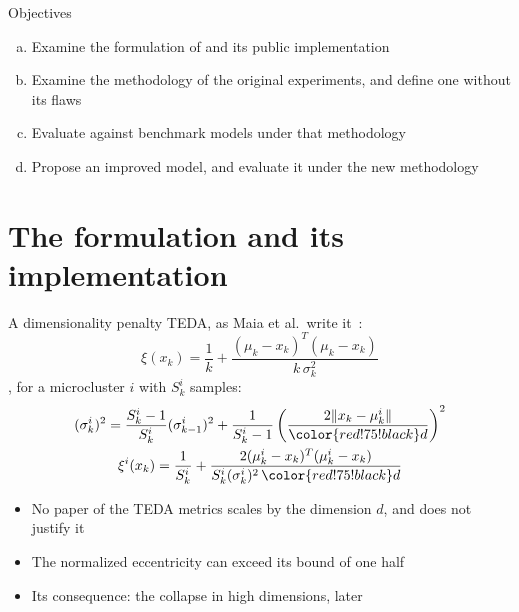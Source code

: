 \documentclass[aspectratio=169]{beamer}
\newcommand{\hl}[1]{{\color{red!75!black}#1}}
\begin{document}
\begin{frame}{Objectives}
  \begin{enumerate}[a)]
    \item Examine the formulation of \MicroTEDAClus and its public implementation
    \item Examine the methodology of the original experiments, and define one without its flaws
    \item Evaluate \MicroTEDAClus against benchmark models under that methodology
    \item Propose an improved model, and evaluate it under the new methodology
  \end{enumerate}
\end{frame}

\section{The formulation and its implementation}

\begin{frame}{A dimensionality penalty}
  TEDA, as Maia et al.\ write it~\cite{angelov2014outside,maia2020evolvclus}:
  \[
    \xi(x_k) = \frac{1}{k} + \frac{(\mu_k - x_k)^T(\mu_k - x_k)}{k\,\sigma^2_k}
  \]
  \MicroTEDAClus, for a microcluster $i$ with $S^i_k$ samples:
  \begin{gather*}
    (\sigma^i_k)^2 = \frac{S^i_k - 1}{S^i_k}(\sigma^i_{k-1})^2 + \frac{1}{S^i_k - 1}\left(\frac{2\lVert x_k - \mu^i_k\rVert}{\hl{d}}\right)^2\\
    \xi^i(x_k) = \frac{1}{S^i_k} + \frac{2(\mu^i_k - x_k)^T(\mu^i_k - x_k)}{S^i_k(\sigma^i_k)^2\,\hl{d}}
  \end{gather*}
  \begin{itemize}
    \item No paper of the TEDA metrics scales by the dimension $d$, and \cite{maia2020evolvclus} does not justify it
    \item The normalized eccentricity can exceed its bound of one half
    \item Its consequence: the collapse in high dimensions, later
  \end{itemize}
\end{frame}
\end{document}

